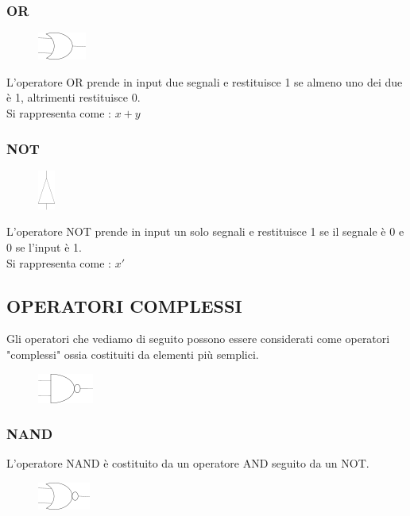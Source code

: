 \documentclass[a4paper]{book}
\begin{document}
\subsubsection*{OR}
\begin{figure}
\includegraphics{OrGate}
\end{figure}
L'operatore OR prende in input due segnali e restituisce 1 se almeno uno dei due è 1, altrimenti restituisce 0.
\\ Si rappresenta come : \(x+y\)\\
\subsubsection*{NOT}
\begin{figure}
\includegraphics{NotGate}
\end{figure}
L'operatore NOT prende in input un solo segnali e restituisce 1 se il segnale è 0 e 0 se l'input è 1.
\\ Si rappresenta come : \(x'\)

\newpage
\subsection{OPERATORI COMPLESSI}
Gli operatori che vediamo di seguito possono essere considerati come operatori "complessi" ossia costituiti da elementi più semplici.
\begin{figure}
\includegraphics{NandGate}
\end{figure}
\subsubsection*{NAND}
L'operatore NAND è costituito da un operatore AND seguito da un NOT.
\begin{figure}
\includegraphics{NorGate}
\end{figure}
\end{document}
